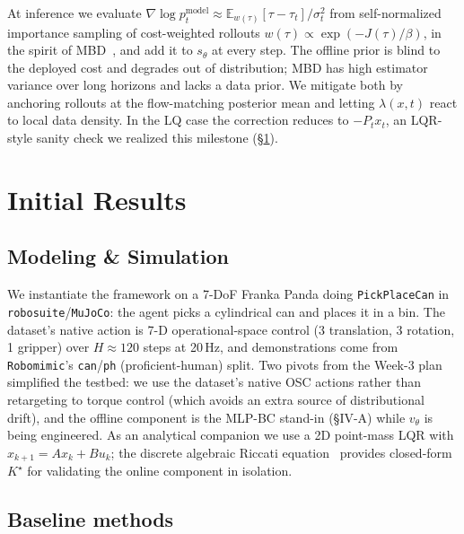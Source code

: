 \documentclass[letterpaper, 10 pt, conference]{ieeeconf}
\begin{document}
At inference we evaluate
$\nabla\log p^{\mathrm{model}}_t\!\approx\!
\mathbb{E}_{w(\tau)}[\tau-\tau_t]/\sigma_t^2$ from self-normalized
importance sampling of cost-weighted rollouts
$w(\tau)\propto\exp(-J(\tau)/\beta)$, in the spirit of
MBD~\cite{mbd}, and add it to $s_\theta$ at every step. The offline
prior is blind to the deployed cost and degrades out of
distribution; MBD has high estimator variance over long horizons
and lacks a data prior. We mitigate both by anchoring rollouts at
the flow-matching posterior mean and letting $\lambda(x,t)$ react
to local data density. In the LQ case the correction reduces to
$-P_t x_t$, an LQR-style sanity check we realized this milestone
(\S\ref{sec:initial-results}).

\section{Initial Results}
\label{sec:initial-results}

\subsection{Modeling \& Simulation}

We instantiate the framework on a 7-DoF Franka Panda doing
\texttt{PickPlaceCan} in \texttt{robosuite}/\texttt{MuJoCo}: the
agent picks a cylindrical can and places it in a bin. The dataset's
native action is 7-D operational-space control (3 translation, 3
rotation, 1 gripper) over $H\!\approx\!120$ steps at 20\,Hz, and
demonstrations come from \texttt{Robomimic}'s
\texttt{can}/\texttt{ph} (proficient-human) split. Two pivots from
the Week-3 plan simplified the testbed: we use the dataset's
native OSC actions rather than retargeting to torque control (which
avoids an extra source of distributional drift), and the offline
component is the MLP-BC stand-in (\S IV-A) while $v_\theta$ is
being engineered. As an analytical companion we use a 2D
point-mass LQR with $x_{k+1}=Ax_k+Bu_k$; the discrete algebraic
Riccati equation~\cite{lewis2012optimal} provides closed-form
$K^{\star}$ for validating the online component in isolation.

\subsection{Baseline methods}
\end{document}
